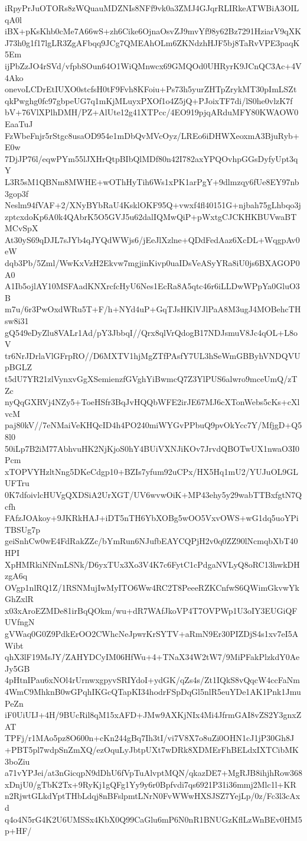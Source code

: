 iRpyPrJuOTORs8zWQuauMDZNIs8NFf9vk0a3ZMJ4GJqrRLIRkeATWBiA3OILqA0l
iBX+pKsKhb0cMe7A66wS+zh6Cike6OjnaOsvZJ9mvYf98y62Bz7291HziarV9qXK
J73h0g1f17lgLR3ZgAFbqq9JCg7QMEAhOLm6ZKNdzhHJF5bj8TaRvVPE3paqK5Em
ijPbZzJO4rSVd/vfpbSOun64O1WiQMnwcx69GMQOd0UHRyrK9JCnQC3Ac+4V4Ako
onevoLCDrEtIUXO0stcfsH0tF9Fvh8KFoiu+Ps73h5yurZHTpZrykMT30pImLSZt
qkPwghg0fc97gbpeUG7q1mKjMLuyxPXOf1o4Z5jQ+PJoixTF7di/lS0he0vlzK7f
bV+76VlXPlhDMH/PZ+AlUte12g41XTPcc/4EO919pjqARduMFY80KWAOW0EaaTuJ
FzWbeFnjr5rStgc8usaOD954e1mDbQvMVcOyz/LREo6iDHWXeoxmA3BjuRyb+E0w
7DjJP76l/eqwPYm55lJXHrQtpBIbQlMDf80n42I782axYPQOvhpGGsDyfyUpt3qY
L3R5sM1QBNm8MWHE+wOThHyTih6Ws1xPK1arPgY+9dlmzqy6fUe8EY97nb3gop3f
Neslm94fVAF+2/XNyBYbRaU4KsklOKF95Q+vwxf4fl40151G+njbah75gLhbqo3j
zptcxdoKp6A0k4QAbrK5O5GVJ5u62dalIQMwQiP+pWxtgCJCKHKBUVwaBTMCvSpX
At30yS69qDJL7sJYb4qJYQdWWjs6/jEeJlXzlne+QDdFedAaz6XcDL+WqgpAv0eW
dqb3Pb/5Zml/WwKxVzH2Ekvw7mgjinKivp0uaIDsVeASyYRa8iU0js6BXAGOP0A0
A1Ib5ojlAY10MSFAadKNXrcfcHyU6Nes1EcRa8A5qtc46r6iLLDwWPpYa0GluO3B
m7u/6r3PwOxdWRu5T+F/h+NYd4uP+GqTJsHKlVJlPaA8M3ugJ4MOBehcTHsw8i31
gQ549eDyZlu8VALr1Ad/pY3JbbqI//Qrx8qlVrQdogB17NDJsmuV8Jc4qOL+L8oV
tr6NrJDrlaVlGFrpRO//D6MXTV1hjMgZTfPAsfY7UL3hSeWmGBByhVNDQVUpBGLZ
t5dU7YR21zlVynxvGgXSemienzfGVghYiBwmcQ7Z3YlPUS6alwro9mceUmQ/zTZc
nyQqGXRVj4NZy5+ToeHSfr3BqJvHQQbWFE2irJE67MJ6cXTonWebs5cKs+cXlvcM
paj80kV//7eNMaiVeKHQcID4h4PO240miWYGvPPbuQ9pvOkYcc7Y/MfjgD+Q58l0
50iLp7B2iM77AbhvuHK2NjKjoS0hY4BUiVXNJiKOv7JrvdQBOTwUX1nwaO3I0Pcm
xTOPVYHzltNng5DKeCdgp10+BZIs7yfum92uCPx/HX5Hq1mU2/YUJuOL9GLUFTru
0K7dfoivlcHUVgQXDSiA2UrXGT/UV6wvwOiK+MP43ehy5y29wabTTBxfgtN7Qcfh
FAfzJOAkoy+9JKRkHAJ+iDT5nTH6YbXOBg5wOO5VxvOWS+wG1dq5uoYPiTBSUg7p
geiSnhCw0wE4FdRakZZc/bYmRun6NJufbEAYCQPjH2v0q0ZZ90lNcmqbXbT40HPI
XpHMRkiNfNmLSNk/D6yxTUx3Xo3V4K7c6FytC1cPdgaNVLyQ8oRC13hwkDHzgA6q
OVgp1nlRQ1Z/1RSNMujIwMyITO6Ww4RC2T8PeeeRZKCnfwS6QWimGkvwYkGhZxlR
x03xAroEZMDe81irBqQOkm/wu+dR7WAfJkoVP4T7OVPWp1U3oIY3EUGiQFUVfngN
gVWaq0G0Z9PdkErOO2CWhcNeJpwrKrSYTV+aRmN9Er30PIZDjS4s1xv7eI5AWibt
qhX3lF19MsJY/ZAHYDCyIM06HfWu+4+TNaX34W2tW7/9MiPFakPlzkdY0AeJy5GB
4pHtnIPau6xNOl4rUrnwxgpyvSRIYdoI+ydGK/qZs4s/Zt1IQkS8vQqcW4ccFaNm
4WmC9MhknB0wGPqhIKGcQTapKI34hodrFSpDqGl5nlR5euYDe1AK1Pnk1JmuPeZn
iF0UiUIJ+4H/9BUcRil8qM15xAFD+JMw9AXKjNIx4Mi4JfrmGAI8vZS2Y3gnxZAT
TPFj/r1MAo5pz8O600n+cKn244gBq7Ih3tI/vi7V8X7o8uZi0OHN1cJ1jP30Gh8J
+PBT5pl7wdpSnZmXQ/ezOquLyJbtpUXt7wDRk8XDMErFhBELdxIXTCibMK3boZiu
a71vYPJei/at3nGicqpN9dDhU6fVpTuAlvptMQN/qkazDE7+MgRJB8ihjhRow368
xDnjU0/gTbK2Tx+9RyKj1gQFg1Yy9y6r0Bpfvdi7qs6921P31i36mmj2Mlc1l+KR
n2RjwtGLkdYptTHbLdqj8nBFslpmtLNrN0FvWWwHXSJSZ7YejLp/0z/Fc3l3cAxd
q4o4N5rG4K2U6UMSSx4KbX0Q99CaGlu6mP6N0nR1BNUGzKflLzWnBEv0HM5p+HF/
